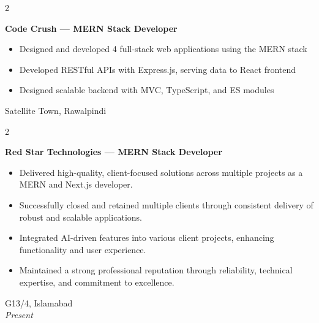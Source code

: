 \documentclass[10pt, letterpaper]{article}
\newenvironment{highlights}{
    \begin{itemize}[
        topsep=0.10 cm,
        parsep=0.10 cm,
        partopsep=0pt,
        itemsep=0pt,
        leftmargin=0.4 cm + 10pt
    ]
}{
    \end{itemize}
}
\newenvironment{twocolentry}[2][]{
    \onecolentry
    \def\secondColumn{#2}
    \setcolumnwidth{\fill, 4.5 cm}
    \begin{paracol}{2}
}{
    \switchcolumn \raggedleft \secondColumn
    \end{paracol}
    \endonecolentry
}
\begin{document}
\begin{twocolentry}{
		Satellite Town, Rawalpindi\\
	}
	\textbf{Code Crush — MERN Stack Developer}
	\begin{highlights}
		\item Designed and developed 4 full-stack web applications using the MERN stack
		\item Developed RESTful APIs with Express.js, serving data to React frontend
		\item Designed scalable backend with MVC, TypeScript, and ES modules
	\end{highlights}
\end{twocolentry}
\begin{twocolentry}{
    G13/4, Islamabad\\
    \textit{Present}
}
\textbf{Red Star Technologies — MERN Stack Developer}
\begin{highlights}
    \item Delivered high-quality, client-focused solutions across multiple projects as a MERN and Next.js developer.
    \item Successfully closed and retained multiple clients through consistent delivery of robust and scalable applications.
    \item Integrated AI-driven features into various client projects, enhancing functionality and user experience.
    \item Maintained a strong professional reputation through reliability, technical expertise, and commitment to excellence.
\end{highlights}
\end{twocolentry}
\end{document}
